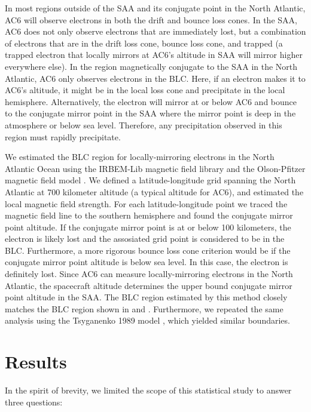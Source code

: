\documentclass[draft]{agujournal2019}
\begin{document}
In most regions outside of the SAA and its conjugate point in the North Atlantic, AC6 will observe electrons in both the drift and bounce loss cones. In the SAA, AC6 does not only observe electrons that are immediately lost, but a combination of electrons that are in the drift loss cone, bounce loss cone, and trapped (a trapped electron that locally mirrors at AC6's altitude in SAA will mirror higher everywhere else). In the region magnetically conjugate to the SAA in the North Atlantic, AC6 only observes electrons in the BLC. Here, if an electron makes it to AC6's altitude, it might be in the local loss cone and precipitate in the local hemisphere. Alternatively, the electron will mirror at or below AC6 and bounce to the conjugate mirror point in the SAA where the mirror point is deep in the atmosphere or below sea level. Therefore, any precipitation observed in this region must rapidly precipitate. 

We estimated the BLC region for locally-mirroring electrons in the North Atlantic Ocean using the IRBEM-Lib magnetic field library and the Olson-Pfitzer magnetic field model \cite{irbem, Olson1982}. We defined a latitude-longitude grid spanning the North Atlantic at 700 kilometer altitude (a typical altitude for AC6), and estimated the local magnetic field strength. For each latitude-longitude point we traced the magnetic field line to the southern hemisphere and found the conjugate mirror point altitude. If the conjugate mirror point is at or below 100 kilometers, the electron is likely lost and the assosiated grid point is considered to be in the BLC. Furthermore, a more rigorous bounce loss cone criterion would be if the conjugate mirror point altitude is below sea level. In this case, the electron is definitely lost. Since AC6 can measure locally-mirroring electrons in the North Atlantic, the spacecraft altitude determines the upper bound conjugate mirror point altitude in the SAA. The BLC region estimated by this method closely matches the BLC region shown in  and . Furthermore, we repeated the same analysis using the Tsyganenko 1989 model \cite{Tsyganenko1989}, which yielded similar boundaries.

\section{Results} \label{results}
In the spirit of brevity, we limited the scope of this statistical study to answer three questions:
\end{document}
